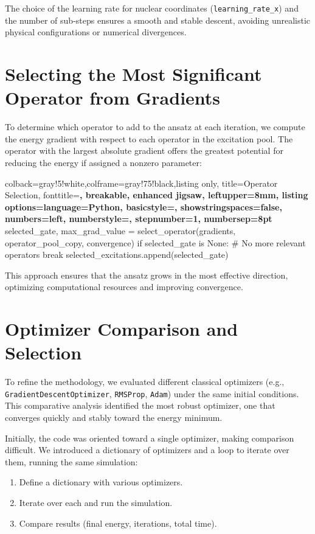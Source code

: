 The choice of the learning rate for nuclear coordinates (\texttt{learning\_rate\_x}) and the number of sub-steps ensures a smooth and stable descent, avoiding unrealistic physical configurations or numerical divergences.

\section{Selecting the Most Significant Operator from Gradients}

To determine which operator to add to the ansatz at each iteration, we compute the energy gradient with respect to each operator in the excitation pool. The operator with the largest absolute gradient offers the greatest potential for reducing the energy if assigned a nonzero parameter:

\begin{tcblisting}{colback=gray!5!white,colframe=gray!75!black,listing only,
    title=Operator Selection, fonttitle=\bfseries, breakable, enhanced jigsaw, leftupper=8mm,
    listing options={language=Python, basicstyle=\ttfamily\small,
    showstringspaces=false, numbers=left, numberstyle=\footnotesize, stepnumber=1, numbersep=8pt}}
selected_gate, max_grad_value = select_operator(gradients, operator_pool_copy, convergence)
if selected_gate is None:
    # No more relevant operators
    break
selected_excitations.append(selected_gate)
\end{tcblisting}

This approach ensures that the ansatz grows in the most effective direction, optimizing computational resources and improving convergence.

\section{Optimizer Comparison and Selection}

To refine the methodology, we evaluated different classical optimizers (e.g., \texttt{GradientDescentOptimizer}, \texttt{RMSProp}, \texttt{Adam}) under the same initial conditions. This comparative analysis identified the most robust optimizer, one that converges quickly and stably toward the energy minimum.

Initially, the code was oriented toward a single optimizer, making comparison difficult. We introduced a dictionary of optimizers and a loop to iterate over them, running the same simulation:

\begin{enumerate}
    \item Define a dictionary with various optimizers.
    \item Iterate over each and run the simulation.
    \item Compare results (final energy, iterations, total time).
\end{enumerate}

